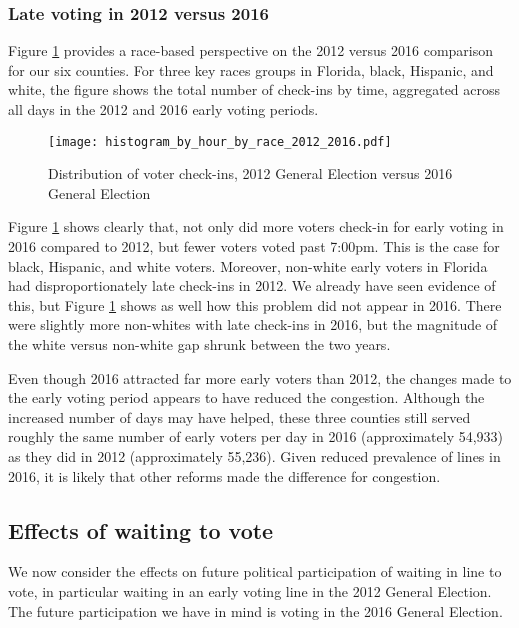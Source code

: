 \documentclass[12pt,titlepage]{article}
\begin{document}
\subsubsection*{Late voting in 2012 versus 2016}

Figure \ref{fig:race2012and2016} provides a race-based perspective on
the 2012 versus 2016 comparison for our six counties.  For three key
races groups in Florida, black, Hispanic, and white, the figure shows
the total number of check-ins by time, aggregated across all days in
the 2012 and 2016 early voting periods.

\begin{figure}[!ht]
  \caption{Distribution of voter check-ins, 2012 General Election versus 2016 General Election}
  \label{fig:race2012and2016}
  \centering
  \centering\texttt{[image: histogram\_by\_hour\_by\_race\_2012\_2016.pdf]}
\end{figure}

Figure \ref{fig:race2012and2016} shows clearly that, not only did more
voters check-in for early voting in 2016 compared to 2012, but fewer
voters voted past 7:00pm.  This is the case for black, Hispanic, and
white voters. Moreover, non-white early voters in Florida had
disproportionately late check-ins in 2012.  We already have seen
evidence of this, but Figure \ref{fig:race2012and2016} shows as well
how this problem did not appear in 2016.  There were slightly more
non-whites with late check-ins in 2016, but the magnitude of the white
versus non-white gap shrunk between the two years.

Even though 2016 attracted far more early voters than 2012, the
changes made to the early voting period appears to have reduced the
congestion. Although the increased number of days may have helped,
these three counties still served roughly the same number of early
voters per day in 2016 (approximately 54,933) as they did in 2012
(approximately 55,236).  Given reduced prevalence of lines in 2016, it
is likely that other reforms made the difference for congestion.




\subsection*{Effects of waiting to vote}

We now consider the effects on future political participation of
waiting in line to vote, in particular waiting in an early voting line
in the 2012 General Election.  The future participation we have in
mind is voting in the 2016 General Election.
\end{document}
